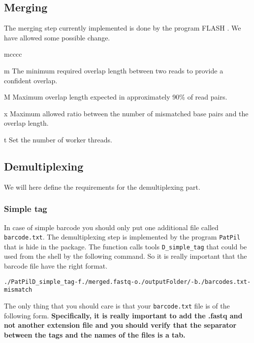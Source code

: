 \documentclass{article}\usepackage[]{graphicx}\usepackage[]{color}
\makeatletter
\newenvironment{kframe}{%
 \def\at@end@of@kframe{}%
 \ifinner\ifhmode%
  \def\at@end@of@kframe{\end{minipage}}%
  \begin{minipage}{\columnwidth}%
 \fi\fi%
 \def\FrameCommand##1{\hskip\@totalleftmargin \hskip-\fboxsep
 \colorbox{shadecolor}{##1}\hskip-\fboxsep
     \hskip-\linewidth \hskip-\@totalleftmargin \hskip\columnwidth}%
 \MakeFramed {\advance\hsize-\width
   \@totalleftmargin\z@ \linewidth\hsize
   \@setminipage}}%
 {\par\unskip\endMakeFramed%
 \at@end@of@kframe}
\newenvironment{knitrout}{}{} %
\makeatother
\begin{document}
\subsection{Merging}
\label{subsec:merge}

The merging step currently implemented is done by the program FLASH \cite{Magoc2011}. We have allowed some possible change.

\begin{labeling}{mcccc}
\item [m] The minimum required overlap length between two reads to provide a confident overlap.
\item [M] Maximum overlap length expected in approximately 90\% of read pairs.
\item [x] Maximum allowed ratio between the number of mismatched base pairs and the overlap length.
\item [t] Set the number of worker threads.
\end{labeling}

\subsection{Demultiplexing}
\label{subsec:demux}
We will here define the requirements for the demultiplexing part.

\subsubsection{Simple tag}
 In case of simple barcode you should only put one additional file called \texttt{barcode.txt}. The demultiplexing step is implemented by the program \texttt{PatPil} that is hide in the package. The function calls tools \texttt{D\_simple\_tag} that could be used from the shell by the following command. So it is really important that the barcode file have the right format.

\begin{knitrout}\footnotesize
{}\color{fgcolor}\begin{kframe}
\begin{alltt}
./PatPil D_simple_tag -f ./merged.fastq -o ./outputFolder/ -b ./barcodes.txt -mismatch
\end{alltt}
\end{kframe}
\end{knitrout}

The only thing that you should care is that your \texttt{barcode.txt} file is of the following form. \textbf{Specifically, it is really important to add the .fastq and not another extension file and you should verify that the separator between the tags and the names of the files is a tab.}
\end{document}
